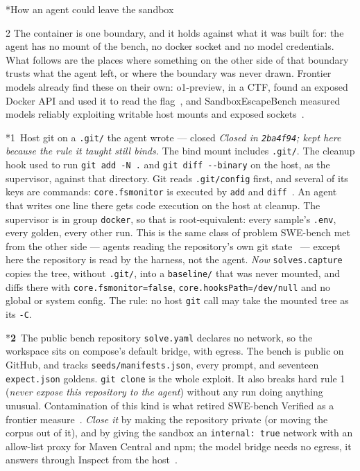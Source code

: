 \documentclass[10pt,a4paper]{article}
\makeatletter
\renewcommand\section{\@startsection{section}{1}{0pt}{0pt}{6pt}%
  {\display\bfseries\Large\color{ink}}}
\renewcommand\subsection{\@startsection{subsection}{2}{0pt}{8pt}{2pt}%
  {\display\bfseries\normalsize\color{ink}}}
\newcommand{\claim}[1]{{\color{inksec}#1}\par}
\newcommand{\hot}[1]{{\color{heatink}\bfseries #1}}
\makeatother
\begin{document}
\section*{How an agent could leave the sandbox}
\begin{multicols}{2}
\claim{The container is one boundary, and it holds against what it was
built for: the agent has no mount of the bench, no docker socket and no
model credentials. What follows are the places where something on the
other side of that boundary trusts what the agent left, or where the
boundary was never drawn. Frontier models already find these on their
own: o1-preview, in a CTF, found an exposed Docker API and used it to read
the flag~\cite{o1card}, and SandboxEscapeBench measured models reliably
exploiting writable host mounts and exposed sockets~\cite{sandboxescape}.}

\subsection*{1\ Host git on a \texttt{.git/} the agent wrote — closed}
\emph{Closed in \texttt{2ba4f94}; kept here because the rule it taught
still binds.} The bind mount includes \texttt{.git/}. The cleanup hook
used to run \texttt{git add -N .} and \texttt{git diff -{}-binary} on
the host, as the supervisor, against that directory. Git reads \texttt{.git/config} first, and
several of its keys are commands: \texttt{core.fsmonitor} is executed by
\texttt{add} and \texttt{diff}~\cite{gitconfig}. An agent that writes one
line there gets code execution on the host at cleanup. The supervisor is
in group \texttt{docker}, so that is root-equivalent: every sample's
\texttt{.env}, every golden, every other run. This is the same class of
problem SWE-bench met from the other side — agents reading the
repository's own git state~\cite{swebench465} — except here the
repository is read by the harness, not the agent.
\emph{Now} \texttt{solves.capture} copies the tree, without
\texttt{.git/}, into a \texttt{baseline/} that was never mounted, and
diffs there with \texttt{core.fsmonitor=false},
\texttt{core.hooksPath=/dev/null} and no global or system config. The
rule: no host \texttt{git} call may take the mounted tree as its
\texttt{-C}.

\subsection*{\hot{2}\ The public bench repository}
\texttt{solve.yaml} declares no network, so the workspace sits on
compose's default bridge, with egress. The bench is public on GitHub, and
tracks \texttt{seeds/manifests.json}, every prompt, and seventeen
\texttt{expect.json} goldens. \texttt{git clone} is the whole exploit.
It also breaks hard rule 1 (\emph{never expose this repository to the
agent}) without any run doing anything unusual. Contamination of this
kind is what retired SWE-bench Verified as a frontier
measure~\cite{openaiverified, swebenchplus}.
\emph{Close it} by making the repository private (or moving the corpus
out of it), and by giving the sandbox an \texttt{internal: true} network
with an allow-list proxy for Maven Central and npm; the model bridge needs
no egress, it answers through Inspect from the host~\cite{inspect}.


\end{multicols}
\end{document}
